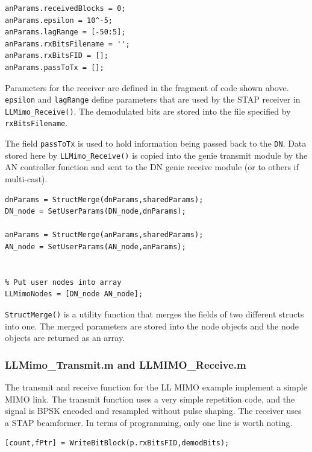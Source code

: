 \begin{lstlisting}[name=llmimoBuild]
% AN-specific (Receiver) parameters
anParams.receivedBlocks = 0;
anParams.epsilon = 10^-5;
anParams.lagRange = [-50:5];
anParams.rxBitsFilename = '';
anParams.rxBitsFID = [];
anParams.passToTx = [];

\end{lstlisting}

Parameters for the receiver are defined in the fragment of code
shown above.  \verb+epsilon+ and \verb+lagRange+ define parameters
that are used by the STAP receiver in \verb+LLMimo_Receive()+.  The
demodulated bits are stored into the file specified by
\verb+rxBitsFilename+.

The field \verb+passToTx+ is used to hold information being passed
back to the \verb+DN+.  Data stored here by \verb+LLMimo_Receive()+
is copied into the genie transmit module by the AN controller
function and sent to the DN genie receive module (or to others if multi-cast).

\begin{lstlisting}[name=llmimoBuild]
% Save parameters within nodes
dnParams = StructMerge(dnParams,sharedParams);
DN_node = SetUserParams(DN_node,dnParams);

anParams = StructMerge(anParams,sharedParams);
AN_node = SetUserParams(AN_node,anParams);


% Put user nodes into array
LLMimoNodes = [DN_node AN_node];
\end{lstlisting}

\verb+StructMerge()+ is a utility function that merges the fields of
two different structs into one.  The merged parameters are stored
into the node objects and the node objects are returned as an array.

\subsubsection{LLMimo\_Transmit.m and LLMIMO\_Receive.m}

The transmit and receive function for the LL MIMO example implement
a simple MIMO link.  The transmit function uses a very simple
repetition code, and the signal is BPSK encoded and resampled
without pulse shaping.  The receiver uses a STAP beamformer. In
terms of programming, only one line is worth noting.

\begin{lstlisting}[name=llmimoReceive,firstnumber=71]
% Save received bits to file for comparison with received bits
[count,fPtr] = WriteBitBlock(p.rxBitsFID,demodBits);
\end{lstlisting}

